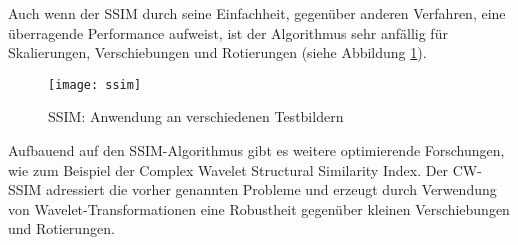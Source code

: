 Auch wenn der SSIM durch seine Einfachheit, gegenüber anderen Verfahren, eine
überragende Performance aufweist, ist der Algorithmus sehr anfällig für
Skalierungen, Verschiebungen und Rotierungen (siehe Abbildung \ref{fig:ssim}).
\parencite{ssim-quality-assessment}

\begin{figure}[H]
    \centering
    \texttt{[image: ssim]}
    \caption{SSIM: Anwendung an verschiedenen Testbildern}
    \label{fig:ssim}
\end{figure}

Aufbauend auf den SSIM-Algorithmus gibt es weitere optimierende Forschungen, wie
zum Beispiel der Complex Wavelet Structural Similarity Index. Der CW-SSIM
adressiert die vorher genannten Probleme und erzeugt durch Verwendung von
Wavelet-Transformationen eine Robustheit gegenüber kleinen Verschiebungen und
Rotierungen. \parencite{ssim-complex-wavelet}
